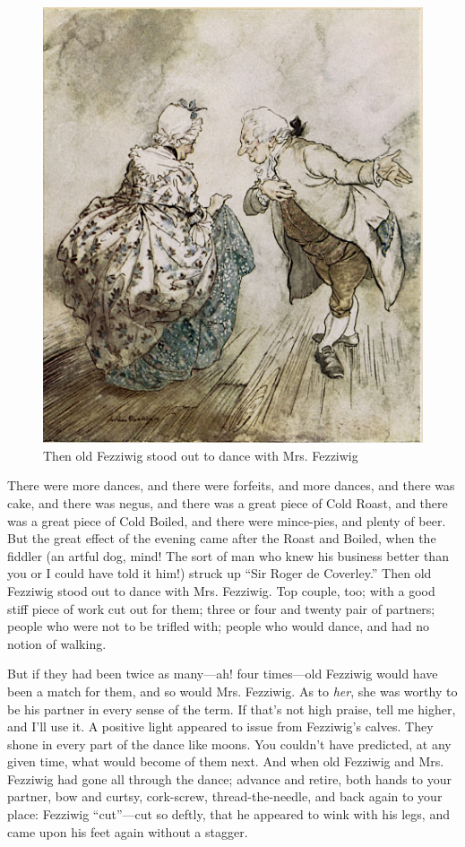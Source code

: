 \documentclass[paper=5.5in:8.5in,BCOR=15mm,twoside,DIV=15,headinclude=off,12pt,chapterprefix=off,openany,headings=huge]{scrbook} %
\begin{document}
\begin{figure}[p]
\begin{minipage}[c]{\linewidth}
\includegraphics[width=\linewidth]{fezzidanceimproved}
\caption*{Then old Fezziwig stood out to dance with Mrs. Fezziwig}
\end{minipage}
\end{figure}

There were more dances, and there were forfeits, and more dances, and there was cake, and there was negus, and there was a great piece of Cold Roast, and there was a great piece of Cold Boiled, and there were mince-pies, and plenty of beer. But the great effect of the evening came after the Roast and Boiled, when the fiddler (an artful dog, mind! The sort of man who knew his business better than you or I could have told it him!) struck up \enquote{Sir Roger de Coverley.} Then old Fezziwig stood out to dance with Mrs. Fezziwig. Top couple, too; with a good stiff piece of work cut out for them; three or four and twenty pair of partners; people who were not to be trifled with; people who would dance, and had no notion of walking.

But if they had been twice as many—ah! four times—old Fezziwig would have been a match for them, and so would Mrs. Fezziwig. As to \textit{her}, she was worthy to be his partner in every sense of the term. If that's not high praise, tell me higher, and I'll use it. A positive light appeared to issue from Fezziwig's calves. They shone in every part of the dance like moons. You couldn't have predicted, at any given time, what would become of them next. And when old Fezziwig and Mrs. Fezziwig had gone all through the dance; advance and retire, both hands to your partner, bow and curtsy, cork-screw, thread-the-needle, and back again to your place: Fezziwig \enquote{cut}—cut so deftly, that he appeared to wink with his legs, and came upon his feet again without a stagger.
\end{document}

